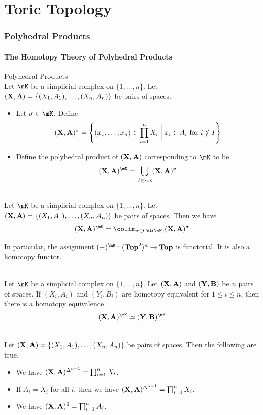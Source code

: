 \documentclass[a4paper]{article}
\begin{document}
\pagebreak
\part{Toric Topology}
\section{Polyhedral Products}
\subsection{The Homotopy Theory of Polyhedral Products}
\begin{defn}{Polyhedral Products}{}\\
Let $\mK$ be a simplicial complex on $\{1,\dots,n\}$. Let $(\bold{X},\bold{A})=\{(X_1,A_1),\dots,(X_n,A_n)\}$ be pairs of spaces. 
\begin{itemize}
\item Let $\sigma\in\mK$. Define $$(\bold{X},\bold{A})^\sigma=\left\{(x_1,\dots,x_n)\in\prod_{i=1}^nX_i\;\bigg{|}\;x_i\in A_i\text{ for }i\notin I\right\}$$
\item Define the polyhedral product of $(\bold{X},\bold{A})$ corresponding to $\mK$ to be $$(\bold{X},\bold{A})^\mK=\bigcup_{I\in\mK}(\bold{X},\bold{A})^\sigma$$
\end{itemize}
\end{defn}

\begin{prp}{}{}\\
Let $\mK$ be a simplicial complex on $\{1,\dots,n\}$. Let $(\bold{X},\bold{A})=\{(X_1,A_1),\dots,(X_n,A_n)\}$ be pairs of spaces. Then we have $$(\bold{X},\bold{A})^\mK=\colim_{\sigma\in\text{Cat}(\mK)}(\bold{X},\bold{A})^\sigma$$
\end{prp}

In particular, the assignment $(-)^\mK:(\bold{Top}^2)^n\to\bold{Top}$ is functorial. It is also a homotopy functor. 

\begin{prp}{}{}\\
Let $\mK$ be a simplicial complex on $\{1,\dots,n\}$. Let $(\bold{X},\bold{A})$ and $(\bold{Y},\bold{B})$ be $n$ pairs of spaces. If $(X_i,A_i)$ and $(Y_i,B_i)$ are homotopy equivalent for $1\leq i\leq n$, then there is a homotopy equivalence $$(\bold{X},\bold{A})^\mK\simeq(\bold{Y},\bold{B})^\mK$$
\end{prp}

\begin{eg}{}{}\\
Let $(\bold{X},\bold{A})=\{(X_1,A_1),\dots,(X_n,A_n)\}$ be pairs of spaces. Then the following are true. 
\begin{itemize}
\item We have $(\bold{X},\bold{A})^{\Delta^{n-1}}=\prod_{i=1}^nX_i$. 
\item If $A_i=X_i$ for all $i$, then we have $(\bold{X},\bold{A})^{\Delta^{n-1}}=\prod_{i=1}^nX_i$. 
\item We have $(\bold{X},\bold{A})^\emptyset=\prod_{i=1}^nA_i$. 
\end{itemize}
\end{eg}
\end{document}
